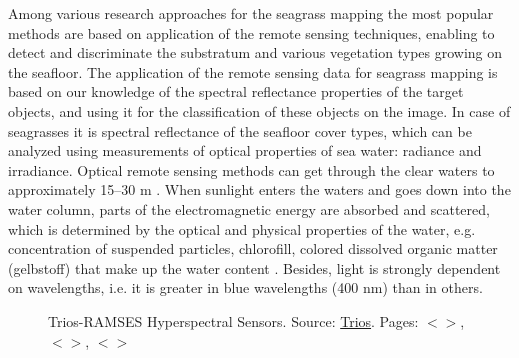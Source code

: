 \documentclass[11pt]{article}
\begin{document}
Among various research approaches for the seagrass mapping the most popular methods are based on application of the remote sensing techniques,
 enabling to detect and discriminate the substratum and various vegetation types growing on the seafloor.
The application of the remote sensing data for seagrass mapping is based on our knowledge of the
spectral reflectance properties of the target objects, and using it for the classification of these objects
on the image. In case of seagrasses it is spectral reflectance of the seafloor cover types, which can be
analyzed using measurements of optical properties of sea water: radiance and irradiance.
Optical remote sensing methods can get through the clear waters to approximately 15–30 m \cite{Mumby04}\label{Mumby04}.
When sunlight enters the waters and goes down into the water column, parts of the
electromagnetic energy are absorbed and scattered, which is determined by the optical and physical
properties of the water, e.g. concentration of suspended particles, chlorofill, colored dissolved
organic matter (gelbstoff) that make up the water content \cite{Ackleson2003}\label{Ackleson, 2003}. Besides, light is strongly
dependent on wavelengths, i.e. it is greater in blue wavelengths (400 nm) than in others.

\begin{figure}[H]
	\centering
	\caption{\ac{Trios-RAMSES} Hyperspectral Sensors. Source: \href{http://www.trios.de}{Trios}. Pages: $<$\pageref{page-12}$>$, $<$\pageref{page-13}$>$, $<$\pageref{page-17}$>$}
	\label{fig:2.1}
\end{figure}
\end{document}
